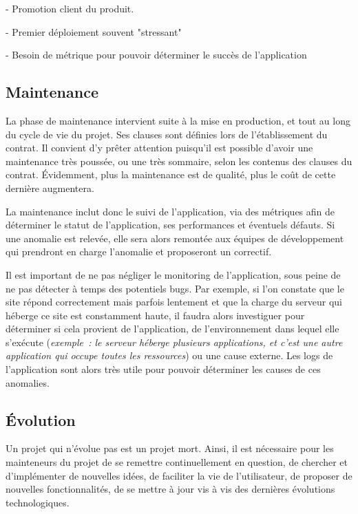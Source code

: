 - Promotion client du produit.

- Premier déploiement souvent "stressant"

- Besoin de métrique pour pouvoir déterminer le succès de l'application


\subsection{Maintenance}

La phase de maintenance intervient suite à la mise en production, et tout au long du cycle de vie du projet. Ses clauses sont définies lors de l'établissement du contrat. Il convient d'y prêter attention puisqu'il est possible d'avoir une maintenance très poussée, ou une très sommaire, selon les contenus des clauses du contrat. Évidemment, plus la maintenance est de qualité, plus le coût de cette dernière augmentera.

La maintenance inclut donc le suivi de l'application, via des métriques afin de déterminer le statut de l'application, ses performances et éventuels défauts. Si une anomalie est relevée, elle sera alors remontée aux équipes de développement qui prendront en charge l'anomalie et proposeront un correctif.

Il est important de ne pas négliger le monitoring de l'application, sous peine de ne pas détecter à temps des potentiels bugs. Par exemple, si l'on constate que le site répond correctement mais parfois lentement et que la charge du serveur qui héberge ce site est constamment haute, il faudra alors investiguer pour déterminer si cela provient de l'application, de l'environnement dans lequel elle s'exécute (\emph{exemple : le serveur héberge plusieurs applications, et c'est une autre application qui occupe toutes les ressources}) ou une cause externe. Les logs de l'application sont alors très utile pour pouvoir déterminer les causes de ces anomalies.


\subsection{Évolution}

Un projet qui n'évolue pas est un projet mort. Ainsi, il est nécessaire pour les mainteneurs du projet de se remettre continuellement en question, de chercher et d'implémenter de nouvelles idées, de faciliter la vie de l'utilisateur, de proposer de nouvelles fonctionnalités, de se mettre à jour vis à vis des dernières évolutions technologiques.

